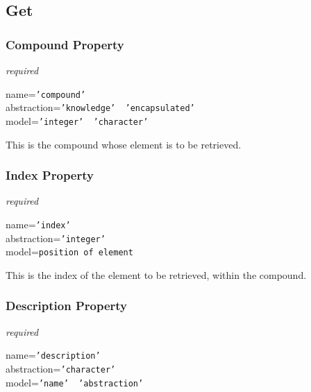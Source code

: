 %
%
%
%
%
%

\subsection{Get}
\label{get_heading}

\subsubsection{Compound Property}

\emph{required}

name=\texttt{'compound'}\\
abstraction=\texttt{'knowledge' \vline\ 'encapsulated'}\\
model=\texttt{'integer' \vline\ 'character'}

This is the compound whose element is to be retrieved.

\subsubsection{Index Property}

\emph{required}

name=\texttt{'index'}\\
abstraction=\texttt{'integer'}\\
model=\texttt{position of element}

This is the index of the element to be retrieved, within the compound.

\subsubsection{Description Property}

\emph{required}

name=\texttt{'description'}\\
abstraction=\texttt{'character'}\\
model=\texttt{'name' \vline\ 'abstraction'}

